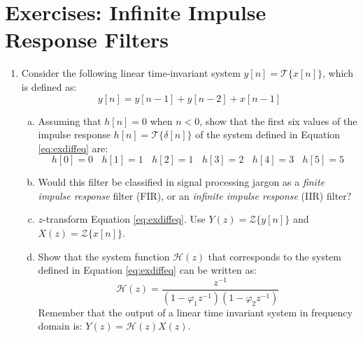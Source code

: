 \newpage
\section{Exercises: Infinite Impulse Response Filters}

\begin{enumerate}

    \item Consider the following linear time-invariant system $y[n] = \mathcal{T}\{x[n]\}$, which is defined as:
          \begin{equation}
              y[n] = y[n-1] + y[n-2] + x[n-1]
              \label{eq:exdiffeq}
          \end{equation}

          \begin{enumerate}[a)]

              \item Assuming that $h[n] = 0$ when $n < 0$, show that the first six values of the impulse response
                    $h[n]=\mathcal{T}\{\delta[n]\}$ of the system defined in Equation \ref{eq:exdiffeq} are:
                    \begin{equation*}
                        h[0] = 0~~~~h[1] = 1~~~~h[2] = 1~~~~h[3] = 2~~~~h[4] = 3~~~~h[5] = 5
                    \end{equation*}

              \item Would this filter be classified in signal processing jargon as a
                    \emph{finite impulse response} filter (FIR), or an \emph{infinite
                        impulse response} (IIR) filter?

              \item $z$-transform Equation \ref{eq:exdiffeq}. Use $Y(z) = \mathcal{Z}\{y[n]\}$ and $X(z) = \mathcal{Z}\{x[n]\}$.

              \item Show that the system function $\mathcal{H}(z)$ that corresponds to the system defined in Equation \ref{eq:exdiffeq} can be written as:
                    \begin{equation*}
                        \mathcal{H}(z)=\frac{z^{-1}}{(1-\varphi_1 z^{-1})(1-\varphi_2 z^{-1})}
                    \end{equation*}
                    Remember that the output of a linear time invariant system in frequency domain is: $Y(z)=\mathcal{H}(z)X(z)$.


\end{enumerate}
\end{enumerate}
